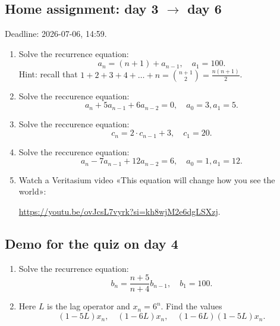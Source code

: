 \documentclass[12pt]{article}
\begin{document}





\subsection*{Home assignment: day 3 $\to$ day 6}

Deadline: 2026-07-06, 14:59. 

\begin{enumerate}
    \item Solve the recurrence equation: 
    \[
    a_n = (n + 1) + a_{n-1}, \quad a_1 = 100.
    \]
    Hint: recall that $1 + 2 + 3 + 4 + \dots + n = {n+1 \choose 2} = \frac{n(n+1)}{2}$.
    \item Solve the reccurence equation:
    \[
    a_n + 5 a_{n-1} + 6 a_{n-2} = 0, \quad a_0 = 3, a_1 = 5.
    \]
    \item Solve the reccurence equation:
    \[
    c_n = 2 \cdot c_{n-1} + 3, \quad c_1 = 20.
    \]
    \item Solve the reccurence equation:
    \[
    a_n - 7 a_{n-1} + 12 a_{n-2} = 6, \quad a_0 = 1, a_1 = 12.
    \]
     \item Watch a Veritasium video «This equation will change how you see the world»:

    \url{https://youtu.be/ovJcsL7vyrk?si=kh8wjM2e6dgLSXzj}.
\end{enumerate}


\subsection*{Demo for the quiz on day 4}

\begin{enumerate}
    \item Solve the recurrence equation:
    \[
    b_n = \frac{n + 5}{n + 4} b_{n-1}, \quad b_1 = 100.
    \]
    \item Here $L$ is the lag operator and $x_n = 6^n$. 
    Find the values
    \[
    (1 - 5L) x_n, \quad (1 - 6L)x_n, \quad (1-6L)(1 - 5L)x_n.
    \]
\end{enumerate}
\end{document}
